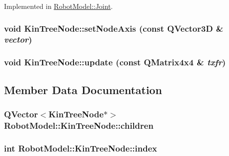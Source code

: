 Implemented in \hyperlink{class_robot_model_1_1_joint_a485f5fc46f5156a7383bee7edbfc6643}{RobotModel::Joint}.\hypertarget{class_robot_model_1_1_kin_tree_node_ae62ad98d6c2151232c20f1542c81a38b}{
\subsubsection[{setNodeAxis}]{\setlength{\rightskip}{0pt plus 5cm}void KinTreeNode::setNodeAxis (const QVector3D \& {\em vector})}}
\label{class_robot_model_1_1_kin_tree_node_ae62ad98d6c2151232c20f1542c81a38b}
\hypertarget{class_robot_model_1_1_kin_tree_node_a7edaa7f382637f6a15c3af68f4dfc7ab}{
\subsubsection[{update}]{\setlength{\rightskip}{0pt plus 5cm}void KinTreeNode::update (const QMatrix4x4 \& {\em txfr})}}
\label{class_robot_model_1_1_kin_tree_node_a7edaa7f382637f6a15c3af68f4dfc7ab}


\subsection{Member Data Documentation}
\hypertarget{class_robot_model_1_1_kin_tree_node_aa954f7e7939949e2e1a72ed9f7be3aaa}{
\subsubsection[{children}]{\setlength{\rightskip}{0pt plus 5cm}QVector$<${\bf KinTreeNode}$\ast$$>$ {\bf RobotModel::KinTreeNode::children}}}
\label{class_robot_model_1_1_kin_tree_node_aa954f7e7939949e2e1a72ed9f7be3aaa}
\hypertarget{class_robot_model_1_1_kin_tree_node_ab7be97fae982037992b0971ab25e643a}{
\subsubsection[{index}]{\setlength{\rightskip}{0pt plus 5cm}int {\bf RobotModel::KinTreeNode::index}}}
\label{class_robot_model_1_1_kin_tree_node_ab7be97fae982037992b0971ab25e643a}


